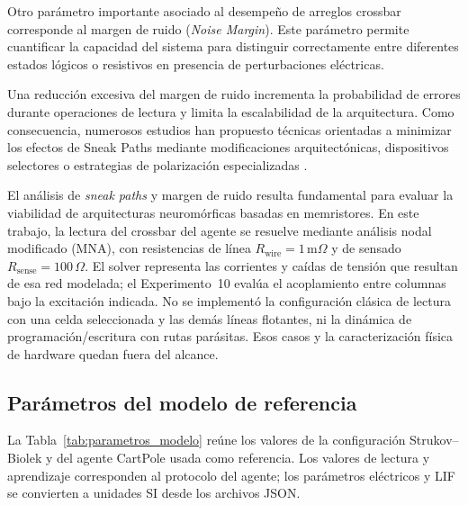 Otro parámetro importante asociado al desempeño de arreglos crossbar corresponde al margen de ruido (\textit{Noise Margin}). Este parámetro permite cuantificar la capacidad del sistema para distinguir correctamente entre diferentes estados lógicos o resistivos en presencia de perturbaciones eléctricas.

Una reducción excesiva del margen de ruido incrementa la probabilidad de errores durante operaciones de lectura y limita la escalabilidad de la arquitectura. Como consecuencia, numerosos estudios han propuesto técnicas orientadas a minimizar los efectos de Sneak Paths mediante modificaciones arquitectónicas, dispositivos selectores o estrategias de polarización especializadas \cite{7}.

El análisis de \textit{sneak paths} y margen de ruido resulta
fundamental para evaluar la viabilidad de arquitecturas neuromórficas
basadas en memristores. En este trabajo, la lectura del crossbar del
agente se resuelve mediante análisis nodal modificado (MNA), con
resistencias de línea $R_{\mathrm{wire}}=1\,\mathrm{m}\Omega$ y de
sensado $R_{\mathrm{sense}}=100\,\Omega$. El solver representa las
corrientes y caídas de tensión que resultan de esa red modelada; el
Experimento~10 evalúa el acoplamiento entre columnas bajo la excitación
indicada. No se implementó la configuración clásica de lectura con una
celda seleccionada y las demás líneas flotantes, ni la dinámica de
programación/escritura con rutas parásitas. Esos casos y la
caracterización física de hardware quedan fuera del alcance.

\subsection{Parámetros del modelo de referencia}
\label{subsec:parametros-modelo}

La Tabla~\ref{tab:parametros_modelo} reúne los valores de la
configuración Strukov--Biolek y del agente CartPole usada como
referencia. Los valores de lectura y aprendizaje corresponden al
protocolo del agente; los parámetros eléctricos y LIF se convierten a
unidades SI desde los archivos JSON.

